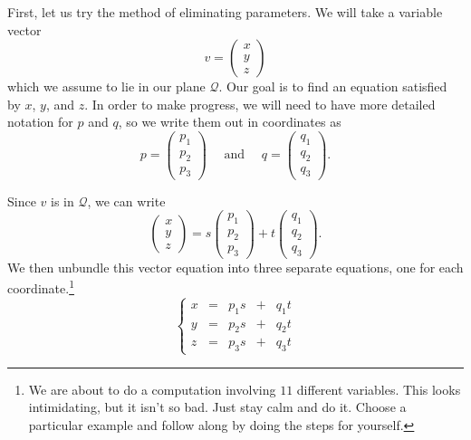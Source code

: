 \documentclass[00-livre-main.tex]{subfiles}
\begin{document}
First, let us try the method of eliminating parameters. We will take a variable vector
\[
v = \begin{pmatrix} x \\ y \\z \end{pmatrix}
\]
which we assume to lie in our plane $\mathcal{Q}$. Our goal is to find an equation satisfied by $x$, $y$, and $z$. In order to make progress, we will need to have more detailed notation for $p$ and $q$, so we write them out in coordinates as
\[
p = \begin{pmatrix} p_1 \\ p_2 \\ p_3 \end{pmatrix} \quad \text{ and } \quad
q = \begin{pmatrix} q_1 \\ q_2 \\ q_3 \end{pmatrix} .
\]



Since $v$ is in $\mathcal{Q}$, we can write
\[
\begin{pmatrix} x \\ y \\ z \end{pmatrix} = s \begin{pmatrix} p_1 \\ p_2 \\ p_3 \end{pmatrix} + t \begin{pmatrix} q_1 \\ q_2 \\ q_3 \end{pmatrix}.
\]
We then unbundle this vector equation into three separate equations, one for each coordinate.\footnote{We are about to do a computation involving $11$ different variables. This looks intimidating, but it isn't so bad. Just stay calm and do it. Choose a particular example and follow along by doing the steps for yourself.}
\[
\left\{ \begin{array}{rrrrr}
x & = & p_1 s & + & q_1 t \\
y & = & p_2 s & + & q_2 t \\
z & = & p_3 s & + & q_3 t 
\end{array}\right.
\]
\end{document}
